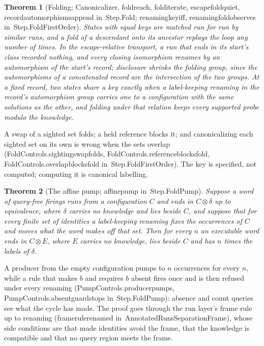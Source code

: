 \documentclass[11pt]{article}
\newtheorem{theorem}{Theorem}
\theoremstyle{remark}
\newcommand{\lean}[1]{{\ttfamily\def\_{\textunderscore\allowbreak}#1}}
\newcommand{\inmod}[1]{in~{\ttfamily\def\_{\textunderscore\allowbreak}#1}}
\begin{document}
\begin{theorem}[Folding; \lean{Canonicalizer}, \lean{fold\_reach}, \lean{fold\_iterate}, \lean{escape\_fold\_quiet}, \lean{record\_automorphisms\_append} \inmod{Step.Fold}; \lean{renaming\_key\_iff}, \lean{renaming\_fold\_observes} \inmod{Step.FoldFirstOrder}]
States with equal keys are matched run for run by similar runs, and a fold of a descendant onto its
ancestor replays the loop any number of times. In the escape-relative transport, a run that ends in its
start's class recorded nothing, and every closing isomorphism renames by an automorphism of the start's
record; disclosure shrinks the folding group, since the automorphisms of a concatenated record are the
intersection of the two groups. At a fixed record, two states share a key exactly when a label-keeping
renaming in the record's automorphism group carries one to a configuration with the same solutions as
the other, and folding under that relation keeps every supported probe modulo the knowledge.
\end{theorem}
A swap of a sighted set folds; a held reference blocks it; and canonicalizing each sighted set on its own
is wrong when the sets overlap (\lean{FoldControls.sighting\_swap\_folds}, \lean{FoldControls.reference\_blocks\_fold},
\lean{FoldControls.overlap\_blocks\_fold} \inmod{Step.FoldFirstOrder}). The key is specified, not computed;
computing it is canonical labelling.

\begin{theorem}[The affine pump; \lean{affine\_pump} \inmod{Step.FoldPump}]
Suppose a word of query-free firings runs from a configuration $C$ and ends in $C\otimes\delta$ up to
equivalence, where $\delta$ carries no knowledge and lies beside $C$, and suppose that for every finite set
of identities a label-keeping renaming fixes the occurrences of $C$ and moves what the word makes off
that set. Then for every $n$ an executable word ends in $C\otimes E$, where $E$ carries no knowledge, lies
beside $C$ and has $n$ times the labels of $\delta$.
\end{theorem}
A producer from the empty configuration pumps to $n$ occurrences for every $n$, while a rule that makes $b$
and requires $b$ absent fires once and is then refused under every renaming
(\lean{PumpControls.producer\_pumps}, \lean{PumpControls.absent\_guard\_stops} \inmod{Step.FoldPump}): absence and count queries see what
the cycle has made. The proof goes through the run layer's frame rule up to renaming
(\lean{frame\_rule\_renamed} \inmod{AnnotatedRunsSeparationFrame}), whose side conditions are that made
identities avoid the frame, that the knowledge is compatible and that no query region meets the frame.
\end{document}
